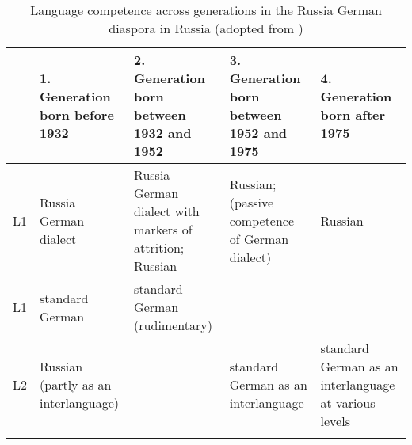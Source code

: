 \begin{table}\small
\begin{tabularx}{\textwidth}{l QQQQ}
	\lsptoprule
			& 1. Generation born before 1932 & 2. Generation born between 1932 and 1952 & 3. Generation born between 1952 and 1975 & 4. Generation born after 1975 \\\midrule
		L1 & Russia German dialect	& Russia German dialect with markers of attrition; Russian	& Russian; (passive competence of German dialect) 	& Russian\\\tablevspace
		L1 & standard German	& standard German (rudimentary)	& 	& \\\tablevspace
		L2 & Russian (partly as an interlanguage)	& 	& standard German as an interlanguage 	& standard German as an interlanguage at various levels\\
		\lspbottomrule
\end{tabularx}
\caption{Language competence across generations in the Russia German diaspora in Russia (adopted from \citealt{riehlTA})\label{tab:3:2}}
\end{table}

